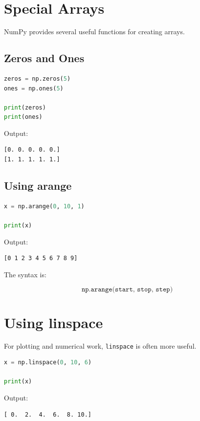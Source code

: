 \documentclass[11pt]{article}
\begin{document}
\section{Special Arrays}

NumPy provides several useful functions for creating arrays.

\subsection{Zeros and Ones}

\begin{lstlisting}[language=Python]
zeros = np.zeros(5)
ones = np.ones(5)

print(zeros)
print(ones)
\end{lstlisting}

Output:

\begin{verbatim}
[0. 0. 0. 0. 0.]
[1. 1. 1. 1. 1.]
\end{verbatim}

\subsection{Using arange}

\begin{lstlisting}[language=Python]
x = np.arange(0, 10, 1)

print(x)
\end{lstlisting}

Output:

\begin{verbatim}
[0 1 2 3 4 5 6 7 8 9]
\end{verbatim}

The syntax is:

\[
\texttt{np.arange(start, stop, step)}
\]

\section{Using linspace}

For plotting and numerical work, \texttt{linspace} is often more useful.

\begin{lstlisting}[language=Python]
x = np.linspace(0, 10, 6)

print(x)
\end{lstlisting}

Output:

\begin{verbatim}
[ 0.  2.  4.  6.  8. 10.]
\end{verbatim}
\end{document}
